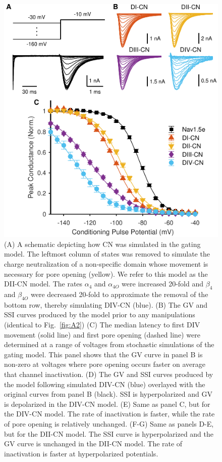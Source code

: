 \begin{figure}[t]
\begin{minipage}[c]{85mm}
    \includegraphics[width=\textwidth]{Figures/AppendixA/figure05.pdf}
\end{minipage}\hfill
\begin{minipage}[c]{80mm}
    \caption{
    (A) A schematic depicting how CN was simulated in the gating model. The leftmost column of states was removed to simulate the charge neutralization of a non-specific domain whose movement is necessary for pore opening (yellow). We refer to this model as the DII-CN model. The rates $\alpha_4$ and $\alpha_{4O}$ were increased 20-fold and $\beta_4$ and $\beta_{4O}$ were decreased 20-fold to approximate the removal of the bottom row, thereby simulating DIV-CN (blue).
    (B) The GV and SSI curves produced by the model prior to any manipulations (identical to Fig.~\ref{fig:A2})
    (C) The median latency to first DIV movement (solid line) and first pore opening (dashed line) were determined at a range of voltages from stochastic simulations of the gating model. This panel shows that the GV curve in panel B is non-zero at voltages where pore opening occurs faster on average that channel inactivation.
    (D) The GV and SSI curves produced by the model following simulated DIV-CN (blue) overlayed with the original curves from panel B (black). SSI is hyperpolarized and GV is depolarized in the DIV-CN model.
    (E) Same as panel C, but for the DIV-CN model. The rate of inactivation is faster, while the rate of pore opening is relatively unchanged. 
    (F-G) Same as panels D-E, but for the DII-CN model. The SSI curve is hyperpolarized and the GV curve is unchanged in the DII-CN model. The rate of inactivation is faster at hyperpolarized potentials.}
    \label{fig:A5}
\end{minipage}
\end{figure}

